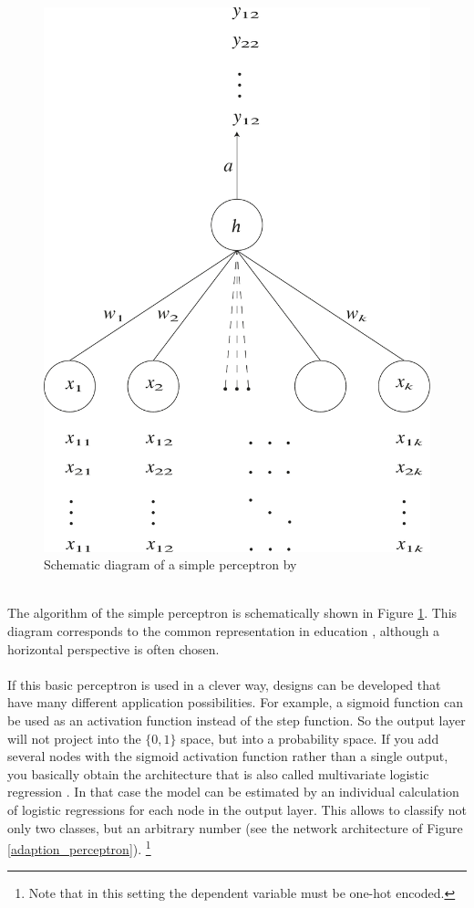\documentclass[11pt,a4paper]{article}
\begin{document}
\begin{figure}[h]
	\centering
	\includegraphics[scale=0.4]{simple_perceptron.pdf}
	\caption{Schematic diagram of a simple perceptron by \cite{Rb1958}}
	\label{simple_perceptron}
\end{figure}
\ \\
The algorithm of the simple perceptron is schematically shown in Figure \ref{simple_perceptron}. This diagram corresponds to the common representation in education \cite{Mekherjee2019}, although a horizontal perspective is often chosen.\\
\\
If this basic perceptron is used in a clever way, designs can be developed that have many different application possibilities. For example, a sigmoid function can be used as an activation function instead of the step function. So the output layer will not project into the $\{0,1\}$ space, but into a probability space. If you add several nodes with the sigmoid activation function rather than a single output, you basically obtain the architecture that is also called multivariate logistic regression \cite{Bahjat2006}. In that case the model can be estimated by an individual calculation of logistic regressions for each node in the output layer. This allows to classify not only two classes, but an arbitrary number (see the network architecture of Figure \ref{adaption_perceptron}). \footnote{Note that in this setting the dependent variable must be one-hot encoded.}\\
\end{document}
